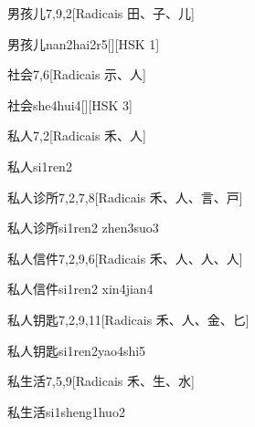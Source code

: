 \begin{entry}{男孩儿}{7,9,2}[Radicais ⽥、⼦、⼉]
  \begin{phonetics}{男孩儿}{nan2hai2r5}[][HSK 1]
  \end{phonetics}
\end{entry}

\begin{entry}{社会}{7,6}[Radicais ⽰、⼈]
  \begin{phonetics}{社会}{she4hui4}[][HSK 3]
  \end{phonetics}
\end{entry}

\begin{entry}{私人}{7,2}[Radicais ⽲、⼈]
  \begin{phonetics}{私人}{si1ren2}
  \end{phonetics}
\end{entry}

\begin{entry}{私人诊所}{7,2,7,8}[Radicais ⽲、⼈、⾔、⼾]
  \begin{phonetics}{私人诊所}{si1ren2 zhen3suo3}
  \end{phonetics}
\end{entry}

\begin{entry}{私人信件}{7,2,9,6}[Radicais ⽲、⼈、⼈、⼈]
  \begin{phonetics}{私人信件}{si1ren2 xin4jian4}
  \end{phonetics}
\end{entry}

\begin{entry}{私人钥匙}{7,2,9,11}[Radicais ⽲、⼈、⾦、⼔]
  \begin{phonetics}{私人钥匙}{si1ren2yao4shi5}
  \end{phonetics}
\end{entry}

\begin{entry}{私生活}{7,5,9}[Radicais ⽲、⽣、⽔]
  \begin{phonetics}{私生活}{si1sheng1huo2}
  \end{phonetics}
\end{entry}

